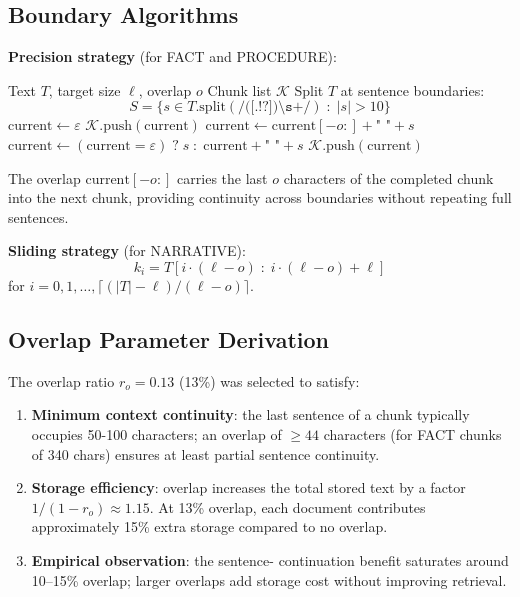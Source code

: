 \documentclass[conference]{IEEEtran}
\begin{document}
\subsection{Boundary Algorithms}

\textbf{Precision strategy} (for FACT and PROCEDURE):
\begin{algorithm}
\caption{Precision Chunking}
\label{alg:precision}
\begin{algorithmic}[1]
\Require Text $T$, target size $\ell$, overlap $o$
\Ensure Chunk list $\mathcal{K}$
\State Split $T$ at sentence boundaries:
\[
  S = \{s \in T.\text{split}(\texttt{/([.!?])\textbackslash s+/})\;:\;|s| > 10\}
\]
\State $\text{current} \leftarrow \varepsilon$
    \State $\mathcal{K}.\text{push}(\text{current})$
    \State $\text{current} \leftarrow
      \text{current}[-o:] + \texttt{" "} + s$
  \Else
    \State $\text{current} \leftarrow
      (\text{current} = \varepsilon)\;?\;s\;:\;\text{current}+\texttt{" "}+s$
  \EndIf
\EndFor
{}
  $\mathcal{K}.\text{push}(\text{current})$
\EndIf
\end{algorithmic}
\end{algorithm}

The overlap $\text{current}[-o:]$ carries the last $o$
characters of the completed chunk into the next chunk,
providing continuity across boundaries without repeating
full sentences.

\textbf{Sliding strategy} (for NARRATIVE):
\begin{equation}
  k_i = T[i \cdot (\ell - o)\;:\;i \cdot (\ell - o) + \ell]
  \label{eq:sliding}
\end{equation}
for $i = 0, 1, \ldots, \lceil (|T| - \ell) / (\ell - o) \rceil$.

\subsection{Overlap Parameter Derivation}

The overlap ratio $r_o = 0.13$ (13\%) was selected to
satisfy:
\begin{enumerate}
  \item \textbf{Minimum context continuity}: the last
    sentence of a chunk typically occupies 50-100 characters;
    an overlap of $\geq 44$ characters (for FACT chunks of
    340 chars) ensures at least partial sentence continuity.
  \item \textbf{Storage efficiency}: overlap increases the
    total stored text by a factor $1 / (1 - r_o) \approx
    1.15$. At 13\% overlap, each document contributes
    approximately 15\% extra storage compared to no overlap.
  \item \textbf{Empirical observation}: the sentence-
    continuation benefit saturates around 10--15\% overlap;
    larger overlaps add storage cost without improving
    retrieval.
\end{enumerate}
\end{document}
